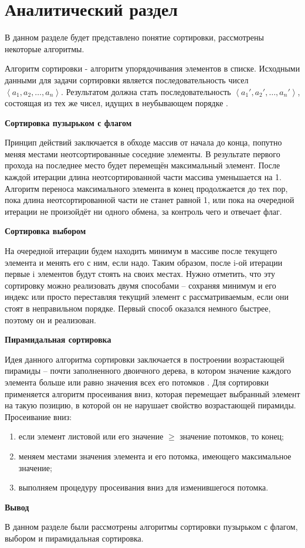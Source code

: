 \chapter{Аналитический раздел}
\label{cha:analysis}
В данном разделе будет представлено понятие сортировки, рассмотрены некоторые алгоритмы.

Алгоритм сортировки - алгоритм упорядочивания элементов в списке. Исходными данными для задачи сортировки является последовательность чисел $\left\langle a_1,a_2,\dots,a_n \right\rangle$. Результатом должна стать последовательность $\left\langle a_1',a_2',\dots,a_n' \right\rangle$, состоящая из тех же чисел, идущих в неубывающем порядке \cite{Cormen}. 

\par\textbf{Сортировка пузырьком с флагом}
\par Принцип действий заключается в обходе массив от начала до конца, попутно меняя местами неотсортированные соседние элементы. В результате первого прохода на последнее место будет перемещён максимальный элемент. После каждой итерации длина неотсортированной части массива уменьшается на 1. Алгоритм переноса максимального элемента в конец продолжается до тех пор, пока длина неотсортированной части не станет равной 1, или пока на очередной итерации не произойдёт ни одного обмена, за контроль чего и отвечает флаг.
\par\textbf{Сортировка выбором}
\par На очередной итерации будем находить минимум в массиве после текущего элемента и менять его с ним, если надо. Таким образом, после i-ой итерации первые i элементов будут стоять на своих местах. Нужно отметить, что эту сортировку можно реализовать двумя способами – сохраняя минимум и его индекс или просто переставляя текущий элемент с рассматриваемым, если они стоят в неправильном порядке. Первый способ оказался немного быстрее, поэтому он и реализован.
\par\textbf{Пирамидальная сортировка}
\par Идея данного алгоритма сортировки заключается в построении возрастающей пирамиды -- почти заполненного двоичного дерева, в котором значение каждого элемента больше или равно значения всех его потомков \cite{Heap}. Для сортировки применяется алгоритм просеивания вниз, которая перемещает выбранный элемент на такую позицию, в которой он не нарушает свойство возрастающей пирамиды. Просеивание вниз:
\begin{enumerate}[1)]
	\item если элемент листовой или его значение $\geq$ значение потомков, то конец;
	\item меняем местами значения элемента и его потомка, имеющего максимальное значение;
	\item выполняем процедуру просеивания вниз для изменившегося потомка. 
\end{enumerate}
\par\textbf{Вывод}
\par В данном разделе были рассмотрены алгоритмы сортировки пузырьком с флагом, выбором и пирамидальная сортировка.